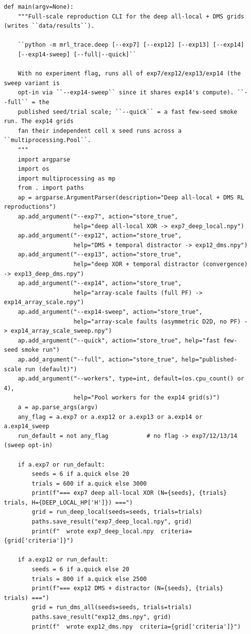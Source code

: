 \begin{lstlisting}[caption={mrl\_trace/deep.py},label={lst:siox-src-deep}]
def main(argv=None):
    """Full-scale reproduction CLI for the deep all-local + DMS grids (writes ``data/results``).

    ``python -m mrl_trace.deep [--exp7] [--exp12] [--exp13] [--exp14]
    [--exp14-sweep] [--full|--quick]``

    With no experiment flag, runs all of exp7/exp12/exp13/exp14 (the sweep variant is
    opt-in via ``--exp14-sweep`` since it shares exp14's compute). ``--full`` = the
    published seed/trial scale; ``--quick`` = a fast few-seed smoke run. The exp14 grids
    fan their independent cell x seed runs across a ``multiprocessing.Pool``.
    """
    import argparse
    import os
    import multiprocessing as mp
    from . import paths
    ap = argparse.ArgumentParser(description="Deep all-local + DMS RL reproductions")
    ap.add_argument("--exp7", action="store_true",
                    help="deep all-local XOR -> exp7_deep_local.npy")
    ap.add_argument("--exp12", action="store_true",
                    help="DMS + temporal distractor -> exp12_dms.npy")
    ap.add_argument("--exp13", action="store_true",
                    help="deep XOR + temporal distractor (convergence) -> exp13_deep_dms.npy")
    ap.add_argument("--exp14", action="store_true",
                    help="array-scale faults (full PF) -> exp14_array_scale.npy")
    ap.add_argument("--exp14-sweep", action="store_true",
                    help="array-scale faults (asymmetric D2D, no PF) -> exp14_array_scale_sweep.npy")
    ap.add_argument("--quick", action="store_true", help="fast few-seed smoke run")
    ap.add_argument("--full", action="store_true", help="published-scale run (default)")
    ap.add_argument("--workers", type=int, default=(os.cpu_count() or 4),
                    help="Pool workers for the exp14 grid(s)")
    a = ap.parse_args(argv)
    any_flag = a.exp7 or a.exp12 or a.exp13 or a.exp14 or a.exp14_sweep
    run_default = not any_flag           # no flag -> exp7/12/13/14 (sweep opt-in)

    if a.exp7 or run_default:
        seeds = 6 if a.quick else 20
        trials = 600 if a.quick else 3000
        print(f"=== exp7 deep all-local XOR (N={seeds}, {trials} trials, H={DEEP_LOCAL_HP['H']}) ===")
        grid = run_deep_local(seeds=seeds, trials=trials)
        paths.save_result("exp7_deep_local.npy", grid)
        print(f"  wrote exp7_deep_local.npy  criteria={grid['criteria']}")

    if a.exp12 or run_default:
        seeds = 6 if a.quick else 20
        trials = 800 if a.quick else 2500
        print(f"=== exp12 DMS + distractor (N={seeds}, {trials} trials) ===")
        grid = run_dms_all(seeds=seeds, trials=trials)
        paths.save_result("exp12_dms.npy", grid)
        print(f"  wrote exp12_dms.npy  criteria={grid['criteria']}")


\end{lstlisting}
